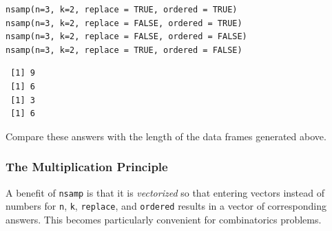 \documentclass[captions=tableheading]{scrbook}
\begin{document}
\lstset{language=R}
\begin{lstlisting}
nsamp(n=3, k=2, replace = TRUE, ordered = TRUE) 
nsamp(n=3, k=2, replace = FALSE, ordered = TRUE) 
nsamp(n=3, k=2, replace = FALSE, ordered = FALSE) 
nsamp(n=3, k=2, replace = TRUE, ordered = FALSE)
\end{lstlisting}

\begin{verbatim}
 [1] 9
 [1] 6
 [1] 3
 [1] 6
\end{verbatim}

Compare these answers with the length of the data frames generated above.
\subsubsection{The Multiplication Principle}
\label{sec-4-5-2-2}


A benefit of \texttt{nsamp} is that it is \emph{vectorized} so that entering vectors instead of numbers for \texttt{n}, \texttt{k}, \texttt{replace}, and \texttt{ordered} results in a vector of corresponding answers. This becomes particularly convenient for combinatorics problems.
\end{document}
